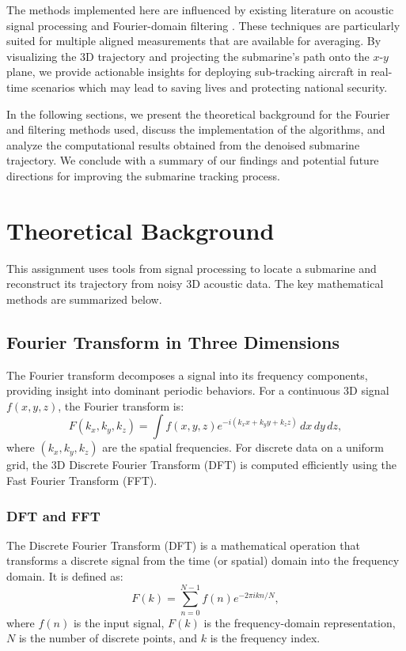 \documentclass[11pt]{amsart}
\begin{document}
The methods implemented here are influenced by existing literature on acoustic signal processing and Fourier-domain filtering \cite{bracewell1986fourier}. These techniques are particularly suited for multiple aligned measurements that are available for averaging. By visualizing the 3D trajectory and projecting the submarine's path onto the $x$-$y$ plane, we provide actionable insights for deploying sub-tracking aircraft in real-time scenarios which may lead to saving lives and protecting national security.

In the following sections, we present the theoretical background for the Fourier and filtering methods used, discuss the implementation of the algorithms, and analyze the computational results obtained from the denoised submarine trajectory. We conclude with a summary of our findings and potential future directions for improving the submarine tracking process.





\section{Theoretical Background}\label{sec:theory}

This assignment uses tools from signal processing to locate a submarine and reconstruct its trajectory from noisy 3D acoustic data. The key mathematical methods are summarized below.

\subsection{Fourier Transform in Three Dimensions}

The Fourier transform decomposes a signal into its frequency components, providing insight into dominant periodic behaviors. For a continuous 3D signal $f(x, y, z)$, the Fourier transform is:
\[
F(k_x, k_y, k_z) = \int f(x, y, z) e^{-i (k_x x + k_y y + k_z z)} \, dx \, dy \, dz,
\]
where $(k_x, k_y, k_z)$ are the spatial frequencies. For discrete data on a uniform grid, the 3D Discrete Fourier Transform (DFT) is computed efficiently using the Fast Fourier Transform (FFT).


\subsubsection{DFT and FFT}

The Discrete Fourier Transform (DFT) is a mathematical operation that transforms a discrete signal from the time (or spatial) domain into the frequency domain. It is defined as:
\[
F(k) = \sum_{n=0}^{N-1} f(n) e^{-2\pi i k n / N},
\]
where $f(n)$ is the input signal, $F(k)$ is the frequency-domain representation, $N$ is the number of discrete points, and $k$ is the frequency index.
\end{document}
